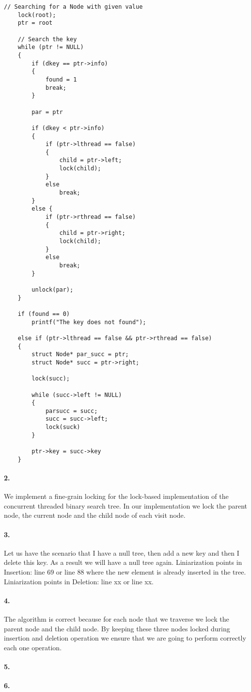 \begin{lstlisting}[style=mycode]
    // Searching for a Node with given value 
	lock(root);
	ptr = root

	// Search the key
    while (ptr != NULL) 
    { 
		if (dkey == ptr->info)
		{
			found = 1
			break;
		}

		par = ptr

		if (dkey < ptr->info)
		{
			if (ptr->lthread == false)
			{
				child = ptr->left;
				lock(child);
			}
			else
				break;
		}
		else {
			if (ptr->rthread == false)
			{
				child = ptr->right;
				lock(child);
			}
			else
				break;
		}

		unlock(par);
	} 

	if (found == 0)
		printf("The key does not found");

	else if (ptr->lthread == false && ptr->rthread == false)
	{
		struct Node* par_succ = ptr;
		struct Node* succ = ptr->right;

		lock(succ);

		while (succ->left != NULL)
		{
			parsucc = succ;
			succ = succ->left;
			lock(suck)
		}

		ptr->key = succ->key
	}

\end{lstlisting}

\paragraph{2.}
We implement a fine-grain locking for the lock-based implementation of
the concurrent threaded binary search tree. In our implementation we
lock the parent node, the current node and the child node of each
visit node.

\paragraph{3.}
Let us have the scenario that I have a null tree, then add a new key
and then I delete this key. As a result we will have a null tree
again.
Liniarization points in Insertion: line 69 or line 88 where the new
element is already inserted in the tree.
Liniarization points in Deletion: line xx or line xx.


\paragraph{4.}
The algorithm is correct because for each node that we traverse we
lock the parent node and the child node. By keeping these three nodes
locked during insertion and deletion operation we ensure that we are
going to perform correctly each one operation.

\paragraph{5.}


\paragraph{6.}

